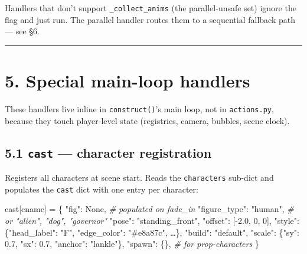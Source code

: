 \documentclass[
  11pt,
]{book}
\newenvironment{Shaded}{}{}
\newcommand{\CommentTok}[1]{\textcolor[rgb]{0.38,0.63,0.69}{\textit{#1}}}
\newcommand{\DecValTok}[1]{\textcolor[rgb]{0.25,0.63,0.44}{#1}}
\newcommand{\FloatTok}[1]{\textcolor[rgb]{0.25,0.63,0.44}{#1}}
\newcommand{\NormalTok}[1]{#1}
\newcommand{\OperatorTok}[1]{\textcolor[rgb]{0.40,0.40,0.40}{#1}}
\newcommand{\StringTok}[1]{\textcolor[rgb]{0.25,0.44,0.63}{#1}}
\newcommand{\VariableTok}[1]{\textcolor[rgb]{0.10,0.09,0.49}{#1}}
\begin{document}
Handlers that don't support \texttt{\_collect\_anims} (the
parallel-unsafe set) ignore the flag and just run. The parallel handler
routes them to a sequential fallback path --- see §6.

\begin{center}\rule{0.5\linewidth}{0.5pt}\end{center}

\section{5. Special main-loop
handlers}\label{special-main-loop-handlers}

These handlers live inline in \texttt{construct()}'s main loop, not in
\texttt{actions.py}, because they touch player-level state (registries,
camera, bubbles, scene clock).

\subsection{\texorpdfstring{5.1 \texttt{cast} --- character
registration}{5.1 cast --- character registration}}\label{cast-character-registration}

Registers all characters at scene start. Reads the \texttt{characters}
sub-dict and populates the \texttt{cast} dict with one entry per
character:

\begin{Shaded}
\begin{Highlighting}[]
\NormalTok{cast[cname] }\OperatorTok{=}\NormalTok{ \{}
    \StringTok{"fig"}\NormalTok{:         }\VariableTok{None}\NormalTok{,          }\CommentTok{\# populated on fade\_in}
    \StringTok{"figure\_type"}\NormalTok{: }\StringTok{"human"}\NormalTok{,       }\CommentTok{\# or "alien", "dog", "governor"}
    \StringTok{"pose"}\NormalTok{:        }\StringTok{"standing\_front"}\NormalTok{,}
    \StringTok{"offset"}\NormalTok{:      [}\OperatorTok{{-}}\FloatTok{2.0}\NormalTok{, }\DecValTok{0}\NormalTok{, }\DecValTok{0}\NormalTok{],}
    \StringTok{"style"}\NormalTok{:       \{}\StringTok{"head\_label"}\NormalTok{: }\StringTok{"F"}\NormalTok{, }\StringTok{"edge\_color"}\NormalTok{: }\StringTok{"\#e8a87c"}\NormalTok{, …\},}
    \StringTok{"build"}\NormalTok{:       }\StringTok{"default"}\NormalTok{,}
    \StringTok{"scale"}\NormalTok{:       \{}\StringTok{"sy"}\NormalTok{: }\FloatTok{0.7}\NormalTok{, }\StringTok{"sx"}\NormalTok{: }\FloatTok{0.7}\NormalTok{, }\StringTok{"anchor"}\NormalTok{: }\StringTok{"lankle"}\NormalTok{\},}
    \StringTok{"spawn"}\NormalTok{:       \{\},            }\CommentTok{\# for prop{-}characters}
\NormalTok{\}}
\end{Highlighting}
\end{Shaded}
\end{document}
